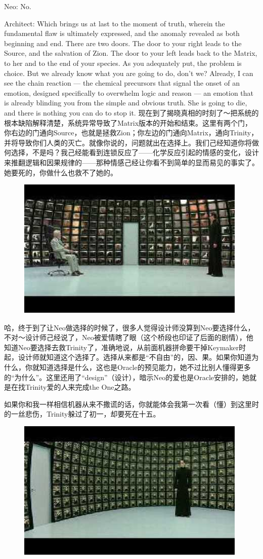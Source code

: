 \documentclass{ctexart}
\begin{document}
Neo: No.

Architect: Which brings us at last to the moment of truth, wherein the fundamental flaw is ultimately expressed, and the anomaly revealed as both beginning and end. There are two doors. The door to your right leads to the Source, and the salvation of Zion. The door to your left leads back to the Matrix, to her and to the end of your species. As you adequately put, the problem is choice. But we already know what you are going to do, don’t we? Already, I can see the chain reaction --- the chemical precursors that signal the onset of an emotion, designed specifically to overwhelm logic and reason --- an emotion that is already blinding you from the simple and obvious truth. She is going to die, and there is nothing you can do to stop it. 现在到了揭晓真相的时刻了～把系统的根本缺陷解释清楚，系统异常导致了Matrix版本的开始和结束。这里有两个门，你右边的门通向Source，也就是拯救Zion；你左边的门通向Matrix，通向Trinity，并将导致你们人类的灭亡。就像你说的，问题就出在选择上。我们己经知道你将做何选择，不是吗？我己经能看到连锁反应了——化学反应引起的情感的变化，设计来推翻逻辑和因果规律的——那种情感己经让你看不到简单的显而易见的事实了。她要死的，你做什么也救不了她的。

\begin{figure}[htb]
\centering
\includegraphics[width=0.5\linewidth]{fig/read_reloaded-166}
\end{figure}

哈，终于到了让Neo做选择的时候了，很多人觉得设计师没算到Neo要选择什么，不对～设计师己经说了，Neo被爱情瞎了眼（这个桥段也印证了后面的剧情），他知道Neo要选择去救Trinity了，准确地说，从前面机器拼命要干掉Keymaker时起，设计师就知道这个选择了。选择从来都是“不自由”的，因、果。如果你知道为什么，你就知道选择是什么，这也是Oracle的预见能力，她不过比别人懂得更多的“为什么”。这里还用了“design”（设计），暗示Neo的爱也是Oracle安排的，她就是在找Trinity爱的人来完成the One之路。

如果你和我一样相信机器从来不撒谎的话，你就能体会我第一次看（懂）到这里时的一丝悲伤，Trinity躲过了初一，却要死在十五。

\begin{figure}[htb]
\centering
\includegraphics[width=0.5\linewidth]{fig/read_reloaded-168}
\end{figure}
\end{document}
